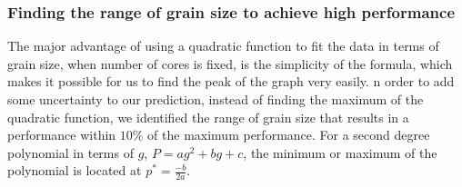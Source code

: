 \vspace{\baselineskip}	
\subsubsection{Finding the range of grain size to achieve high performance}
The major advantage of using a quadratic function to fit the data in terms of grain size, when number of cores is fixed, is the simplicity of the formula, which makes it possible for us to find the peak of the graph very easily. n order to add some uncertainty to our prediction, instead of finding the maximum of the quadratic function, we identified the range of grain size that results in a performance within $10\%$ of the maximum performance. For a second degree polynomial in terms of $g$, $P=ag^2+bg+c$, the minimum or maximum of the polynomial is located at $p^{*}=\frac{-b}{2a}$.    

